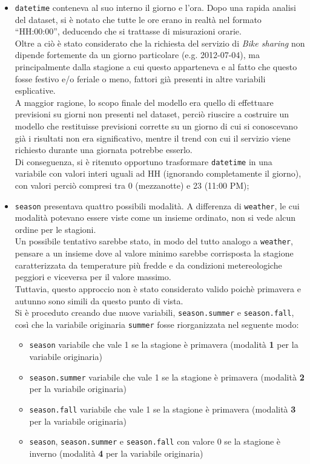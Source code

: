 \begin{itemize}
\item \texttt{datetime} conteneva al suo interno il giorno e l'ora.
  Dopo una rapida analisi del dataset, si è notato che tutte le ore erano in
  realtà nel formato ``HH:00:00'', deducendo che si trattasse di misurazioni
  orarie. \\
  Oltre a ciò è stato considerato che la richiesta del servizio di \emph{Bike
  sharing} non dipende fortemente da un giorno particolare (e.g. 2012-07-04),
  ma principalmente dalla stagione a cui questo apparteneva e al fatto che
  questo fosse festivo e/o feriale o meno, fattori già presenti in altre
  variabili esplicative. \\
  A maggior ragione, lo scopo finale del modello era quello di effettuare
  previsioni su giorni non presenti nel dataset, perciò riuscire a costruire
  un modello che restituisse previsioni corrette su un giorno di cui si
  conoscevano già i risultati non era significativo, mentre il trend con cui
  il servizio viene richiesto durante una giornata potrebbe esserlo.\\
  Di conseguenza, si è ritenuto opportuno trasformare \texttt{datetime} in una
  variabile con valori interi uguali ad HH (ignorando completamente il
  giorno), con valori perciò compresi tra 0 (mezzanotte) e 23 (11:00 PM);
\item \texttt{season} presentava quattro possibili modalità. A differenza di
  \texttt{weather}, le cui modalità potevano essere viste come un insieme
  ordinato, non si vede alcun ordine per le stagioni. \\
  Un possibile tentativo sarebbe stato, in modo del tutto analogo a
  \texttt{weather}, pensare a un insieme dove al valore minimo sarebbe
  corrisposta la stagione caratterizzata da temperature più fredde e da
  condizioni metereologiche peggiori e viceversa per il valore massimo. \\
  Tuttavia, questo approccio non è stato considerato valido poichè primavera e
  autunno sono simili da questo punto di vista. \\
  Si è proceduto creando due nuove variabili, \texttt{season.summer} e
  \texttt{season.fall}, così che la variabile originaria \texttt{summer} fosse
  riorganizzata nel seguente modo:
  \begin{itemize}
  \item \texttt{season} variabile che vale 1 se la stagione è primavera
    (modalità \textbf{1} per la variabile originaria)
  \item \texttt{season.summer} variabile che vale 1 se la stagione è primavera
    (modalità \textbf{2} per la variabile originaria)
  \item \texttt{season.fall} variabile che vale 1 se la stagione è primavera
    (modalità \textbf{3} per la variabile originaria)
  \item  \texttt{season}, \texttt{season.summer} e \texttt{season.fall} con
    valore 0 se la stagione è inverno (modalità \textbf{4} per la variabile
    originaria)
  \end{itemize}
\end{itemize}

